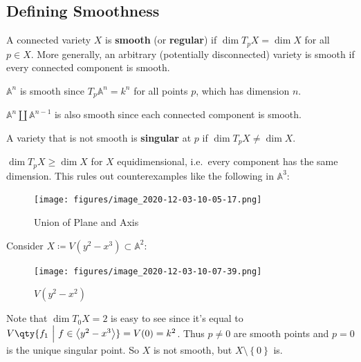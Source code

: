 \hypertarget{defining-smoothness}{%
\subsection{Defining Smoothness}\label{defining-smoothness}}

\begin{definition}

A connected variety \(X\) is \textbf{smooth} (or \textbf{regular}) if
\(\dim T_p X = \dim X\) for all \(p\in X\). More generally, an arbitrary
(potentially disconnected) variety is smooth if every connected
component is smooth.

\end{definition}

\begin{example}[?]

\({\mathbb{A}}^n\) is smooth since \(T_p {\mathbb{A}}^n = k^n\) for all
points \(p\), which has dimension \(n\).

\end{example}

\begin{example}[?]

\({\mathbb{A}}^n {\coprod}{\mathbb{A}}^{n-1}\) is also smooth since each
connected component is smooth.

\end{example}

\begin{definition}

A variety that is not smooth is \textbf{singular} at \(p\) if
\(\dim T_p X \neq \dim X\).

\end{definition}

\begin{fact}

\(\dim T_p X\geq \dim X\) for \(X\) equidimensional, i.e.~every
component has the same dimension. This rules out counterexamples like
the following in \({\mathbb{A}}^3\):

\begin{figure}
\centering
\texttt{[image: figures/image\_2020-12-03-10-05-17.png]}
\caption{Union of Plane and Axis}
\end{figure}

\end{fact}

\begin{example}[?]

Consider \(X\coloneqq V(y^2 - x^3) \subset {\mathbb{A}}^2\):

\begin{figure}
\centering
\texttt{[image: figures/image\_2020-12-03-10-07-39.png]}
\caption{\(V(y^2 - x^2)\)}
\end{figure}

Note that \(\dim T_0 X = 2\) is easy to see since it's equal to
\(V\qty{f_1 {~\mathrel{\Big|}~}f\in \left\langle{y^2 - x^3}\right\rangle} = V(0) = k^2\).
Thus \(p\neq 0\) are smooth points and \(p=0\) is the unique singular
point. So \(X\) is not smooth, but \(X\setminus\left\{{0}\right\}\) is.

\end{example}

